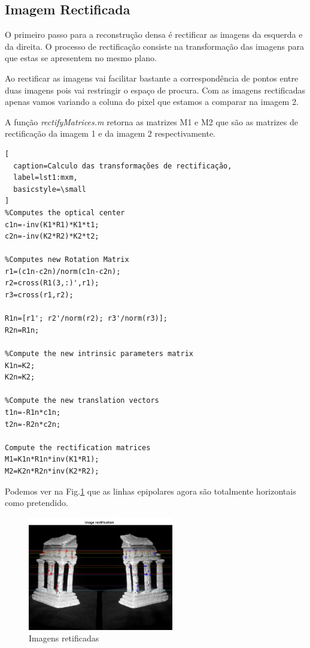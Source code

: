 \documentclass[journal]{IEEEtran}
\begin{document}
\subsection*{Imagem Rectificada}
\par O primeiro passo para a reconstrução densa é rectificar as imagens da esquerda e da direita. O processo de rectificação consiste na transformação das imagens para que estas se apresentem no mesmo plano.
\par Ao rectificar as imagens vai facilitar bastante a correspondência de pontos entre duas imagens pois vai restringir o espaço de procura. Com as imagens rectificadas apenas vamos variando a coluna do pixel que estamos a comparar na imagem 2.
\par A função \textit{rectifyMatrices.m} retorna as matrizes M1 e M2 que são as matrizes de rectificação da imagem 1 e da imagem 2 respectivamente.
\begin{lstlisting}[
  caption=Calculo das transformações de rectificação,
  label=lst1:mxm,
  basicstyle=\small
]
%Computes the optical center
c1n=-inv(K1*R1)*K1*t1;
c2n=-inv(K2*R2)*K2*t2;

%Computes new Rotation Matrix
r1=(c1n-c2n)/norm(c1n-c2n);
r2=cross(R1(3,:)',r1);
r3=cross(r1,r2);

R1n=[r1'; r2'/norm(r2); r3'/norm(r3)];
R2n=R1n;

%Compute the new intrinsic parameters matrix
K1n=K2;
K2n=K2;

%Compute the new translation vectors
t1n=-R1n*c1n;
t2n=-R2n*c2n;

Compute the rectification matrices
M1=K1n*R1n*inv(K1*R1);
M2=K2n*R2n*inv(K2*R2);
\end{lstlisting}
\par Podemos ver na Fig.\ref{fig:4} que as linhas epipolares agora são totalmente horizontais como pretendido.
\begin{figure}[H]
    \centering
    \includegraphics[width=2.5in]{Images/rectificationImages.png}
    \caption{Imagens retificadas}
    \label{fig:4}
\end{figure}
\end{document}
